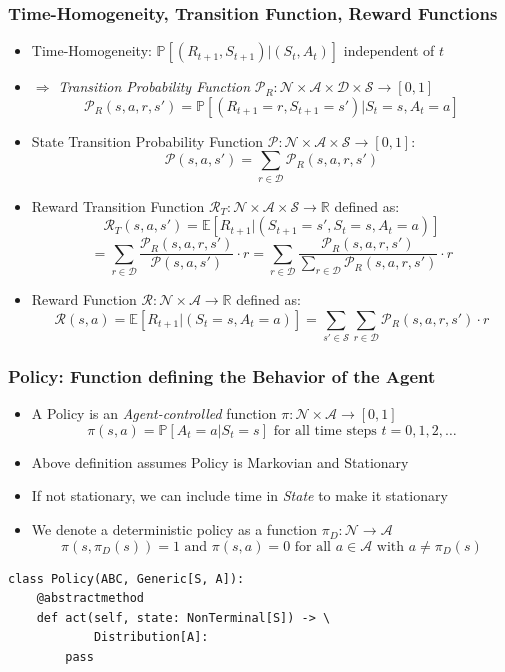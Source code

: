 \documentclass[handout]{beamer}
\begin{document}
\begin{frame}
\frametitle{Time-Homogeneity, Transition Function, Reward Functions}
\pause
\begin{itemize}[<+->]
\item Time-Homogeneity: $\mathbb{P}[(R_{t+1}, S_{t+1}) | (S_t, A_t)]$ independent of $t$
\item $\Rightarrow$ {\em Transition Probability Function} $\mathcal{P}_R: \mathcal{N} \times \mathcal{A} \times \mathcal{D} \times \mathcal{S} \rightarrow [0,1]$
$$\mathcal{P}_R(s,a,r,s') = \mathbb{P}[(R_{t+1}=r, S_{t+1}=s') | S_t=s, A_t = a]$$
\item State Transition Probability Function $\mathcal{P}: \mathcal{N} \times \mathcal{A} \times \mathcal{S} \rightarrow [0,1]$:
$$\mathcal{P}(s, a, s') = \sum_{r\in \mathcal{D}} \mathcal{P}_R(s, a, r, s')$$
\item Reward Transition Function $\mathcal{R}_T: \mathcal{N} \times \mathcal{A} \times \mathcal{S} \rightarrow \mathbb{R}$ defined as:
$$\mathcal{R}_T(s,a,s') = \mathbb{E}[R_{t+1}|(S_{t+1}=s',S_t=s,A_t=a)]$$
$$ = \sum_{r\in \mathcal{D}} \frac {\mathcal{P}_R(s,a,r,s')} {\mathcal{P}(s,a,s')} \cdot r = \sum_{r\in \mathcal{D}} \frac {\mathcal{P}_R(s,a,r,s')} {\sum_{r\in \mathcal{D}} \mathcal{P}_R(s,a,r,s')} \cdot r$$
\item Reward Function $\mathcal{R}: \mathcal{N} \times \mathcal{A} \rightarrow \mathbb{R}$ defined as:
$$\mathcal{R}(s,a) = \mathbb{E}[R_{t+1}|(S_t=s, A_t=a)] = \sum_{s'\in \mathcal{S}} \sum_{r\in\mathcal{D}} \mathcal{P}_R(s,a,r,s') \cdot r$$
\end{itemize}
\end{frame}

\begin{frame}[fragile]
\frametitle{Policy: Function defining the Behavior of the Agent}
\pause
\begin{itemize}[<+->]
\item A Policy is an {\em Agent-controlled} function $\pi: \mathcal{N} \times \mathcal{A} \rightarrow [0,1]$
$$\pi(s, a) = \mathbb{P}[A_t = a|S_t = s] \text{ for all time steps } t = 0, 1, 2, \ldots$$
\item Above definition assumes Policy is Markovian and Stationary
\item If not stationary, we can include time in {\em State} to make it stationary
\item We denote a deterministic policy as a function $\pi_D: \mathcal{N} \rightarrow \mathcal{A}$
$$\pi(s, \pi_D(s)) = 1 \text{ and } \pi(s, a) = 0 \text{ for all } a\in \mathcal{A} \text{ with } a \neq \pi_D(s)$$
\end{itemize}
\pause
\begin{lstlisting}
class Policy(ABC, Generic[S, A]):
    @abstractmethod
    def act(self, state: NonTerminal[S]) -> \
            Distribution[A]:
        pass
\end{lstlisting}
\end{frame}
\end{document}
